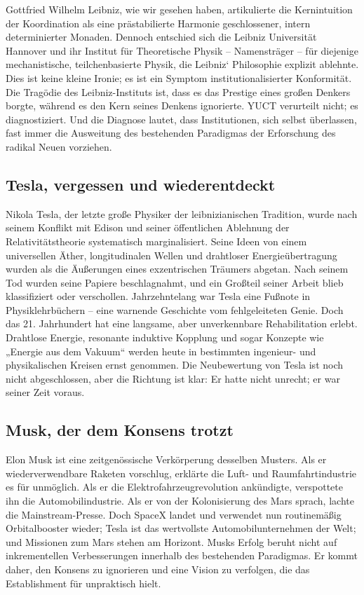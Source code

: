 \documentclass[12pt,a4paper]{article}
\begin{document}
Gottfried Wilhelm Leibniz, wie wir gesehen haben, artikulierte die Kernintuition der Koordination als eine prästabilierte Harmonie geschlossener, intern determinierter Monaden. Dennoch entschied sich die Leibniz Universität Hannover und ihr Institut für Theoretische Physik – Namensträger – für diejenige mechanistische, teilchenbasierte Physik, die Leibniz‘ Philosophie explizit ablehnte. Dies ist keine kleine Ironie; es ist ein Symptom institutionalisierter Konformität. Die Tragödie des Leibniz-Instituts ist, dass es das Prestige eines großen Denkers borgte, während es den Kern seines Denkens ignorierte. YUCT verurteilt nicht; es diagnostiziert. Und die Diagnose lautet, dass Institutionen, sich selbst überlassen, fast immer die Ausweitung des bestehenden Paradigmas der Erforschung des radikal Neuen vorziehen.

\subsection{Tesla, vergessen und wiederentdeckt}

Nikola Tesla, der letzte große Physiker der leibnizianischen Tradition, wurde nach seinem Konflikt mit Edison und seiner öffentlichen Ablehnung der Relativitätstheorie systematisch marginalisiert. Seine Ideen von einem universellen Äther, longitudinalen Wellen und drahtloser Energieübertragung wurden als die Äußerungen eines exzentrischen Träumers abgetan. Nach seinem Tod wurden seine Papiere beschlagnahmt, und ein Großteil seiner Arbeit blieb klassifiziert oder verschollen. Jahrzehntelang war Tesla eine Fußnote in Physiklehrbüchern – eine warnende Geschichte vom fehlgeleiteten Genie. Doch das 21. Jahrhundert hat eine langsame, aber unverkennbare Rehabilitation erlebt. Drahtlose Energie, resonante induktive Kopplung und sogar Konzepte wie „Energie aus dem Vakuum“ werden heute in bestimmten ingenieur- und physikalischen Kreisen ernst genommen. Die Neubewertung von Tesla ist noch nicht abgeschlossen, aber die Richtung ist klar: Er hatte nicht unrecht; er war seiner Zeit voraus.

\subsection{Musk, der dem Konsens trotzt}

Elon Musk ist eine zeitgenössische Verkörperung desselben Musters. Als er wiederverwendbare Raketen vorschlug, erklärte die Luft- und Raumfahrtindustrie es für unmöglich. Als er die Elektrofahrzeugrevolution ankündigte, verspottete ihn die Automobilindustrie. Als er von der Kolonisierung des Mars sprach, lachte die Mainstream-Presse. Doch SpaceX landet und verwendet nun routinemäßig Orbitalbooster wieder; Tesla ist das wertvollste Automobilunternehmen der Welt; und Missionen zum Mars stehen am Horizont. Musks Erfolg beruht nicht auf inkrementellen Verbesserungen innerhalb des bestehenden Paradigmas. Er kommt daher, den Konsens zu ignorieren und eine Vision zu verfolgen, die das Establishment für unpraktisch hielt.
\end{document}
